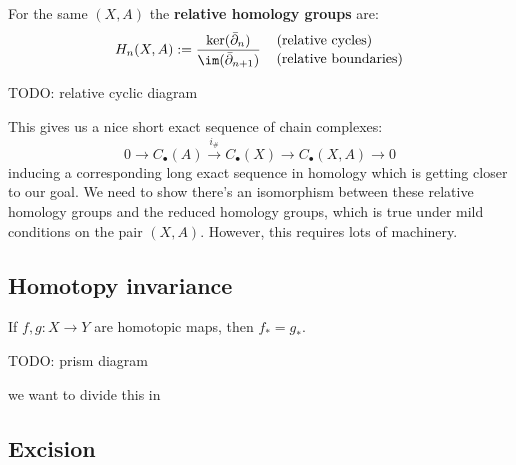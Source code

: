 \documentclass[a4paper]{article}
\begin{document}
\begin{dfn}
    For the same $(X,A)$ the \textbf{relative homology groups} are: \[
    H_n(X,A) := \frac{\ker(\bar{\partial}_n)}{\im(\bar{\partial}_{n+1})} \quad
    \genfrac{}{}{0pt}{}{\text{(relative cycles)\hspace{22pt}}}{\text{(relative boundaries)}}
    \]
\end{dfn}

\begin{exc}
    TODO: relative cyclic diagram
\end{exc}
This gives us a nice short exact sequence of chain complexes: \[
    0\rightarrow C_\bullet(A)\xrightarrow{i_\#} C_\bullet(X) \rightarrow C_\bullet(X,A)\rightarrow 0
\]
inducing a corresponding long exact sequence in homology which is getting closer to our goal. We need to show there's an isomorphism between these relative homology groups and the reduced homology groups, which is true under mild conditions on the pair $(X,A)$. However, this requires lots of machinery.

\subsection{Homotopy invariance}

\begin{thrm}
    If $f,g:X\rightarrow Y$ are homotopic maps, then $f_*=g_*$.
\end{thrm}
TODO: prism diagram

we want to divide this in


\subsection{Excision}




\end{document}
